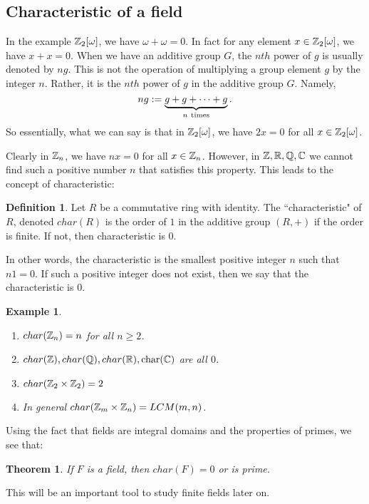 \documentclass[12pt]{article}
\def\char{\text{char}} %
\theoremstyle{plain}
\newtheorem{example}{Example}
\newtheorem{theorem}{Theorem}
\theoremstyle{definition}
\newtheorem{definition}{Definition}
\theoremstyle{remark}
\begin{document}
\subsection{Characteristic of a field}
In the example $\mathbb{Z}_2[\omega]$, we have $\omega+\omega=0$. In fact for any element $x \in \mathbb{Z}_2[\omega]$, we have $x+x=0$. 
When we have an additive group $G$, the $nth$ power of $g$ is usually denoted by $ng$. This is not the operation of multiplying a group element $g$ by the integer $n$. Rather, it is the $nth$ power of $g$ in the additive group $G$. Namely, 
$$ng:=\underbrace{g + g+\cdots + g}_{n\rm\ times}.$$
So essentially, what we can say is that in $\mathbb{Z}_2[\omega]$, we have $2x=0$ for all $x\in \mathbb{Z}_2[\omega]$.

Clearly in $\mathbb{Z}_n$, we have $nx=0$ for all $x\in \mathbb{Z}_n$. However, in $\mathbb{Z}, \mathbb{R}, \mathbb{Q}, \mathbb{C}$ we cannot find such a positive number $n$ that satisfies this property. 
This leads to the concept of characteristic:
\begin{definition}
Let $R$ be a commutative ring with identity. The ``characteristic" of $R$, denoted $char(R)$ is the order of $1$ in the additive group $(R,+)$ if the order is finite. If not, then characteristic is $0$.
\end{definition}
In other words, the characteristic is the smallest positive integer $n$ such that $n1 =0$. If such a positive integer does not exist, then we say that the characteristic is $0$. 

\begin{example}
\begin{enumerate}
    \item $char(\mathbb{Z}_n)=n$ for all $n\geq 2$.
    \item $char(\Z), char(\Q), char(\R), \char(\C)$ are all $0$.
    \item $char(\mathbb{Z}_2\times \mathbb{Z}_2) = 2$
    \item In general $char(\mathbb{Z}_m\times \mathbb{Z}_n) = LCM(m,n)$. 
\end{enumerate}
\end{example}
Using the fact that fields are integral domains and the properties of primes, we see that:
\begin{theorem}
If $F$ is a field, then $char(F)=0$ or is prime. 
\end{theorem}
This will be an important tool to study finite fields later on. 
\end{document}
